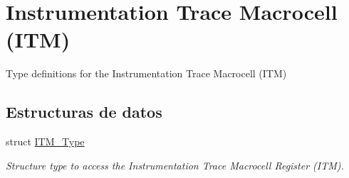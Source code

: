 \hypertarget{group___c_m_s_i_s___i_t_m}{}\section{Instrumentation Trace Macrocell (I\+TM)}
\label{group___c_m_s_i_s___i_t_m}


Type definitions for the Instrumentation Trace Macrocell (I\+TM)  


\subsection*{Estructuras de datos}
\begin{DoxyCompactItemize}
\item 
struct \hyperlink{struct_i_t_m___type}{I\+T\+M\+\_\+\+Type}
\begin{DoxyCompactList}\small\item\em Structure type to access the Instrumentation Trace Macrocell Register (I\+TM). \end{DoxyCompactList}\end{DoxyCompactItemize}
